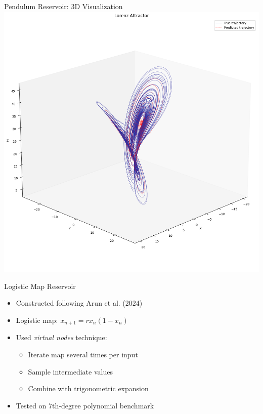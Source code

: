 \documentclass{beamer}
\begin{document}
\begin{frame}{Pendulum Reservoir: 3D Visualization}
\includegraphics[width=1\linewidth]{figures/lorentz_pendulum_2.png}
\caption{3D render of actual vs Predicted timestep}
\end{frame}

\begin{frame}{Logistic Map Reservoir}
\begin{itemize}
\item Constructed following Arun et al. (2024)
\item Logistic map: $x_{n+1} = r x_n (1-x_n)$
\item Used \emph{virtual nodes} technique:
    \begin{itemize}
    \item Iterate map several times per input
    \item Sample intermediate values
    \item Combine with trigonometric expansion
    \end{itemize}
\item Tested on 7th-degree polynomial benchmark
\end{itemize}
\end{frame}
\end{document}
